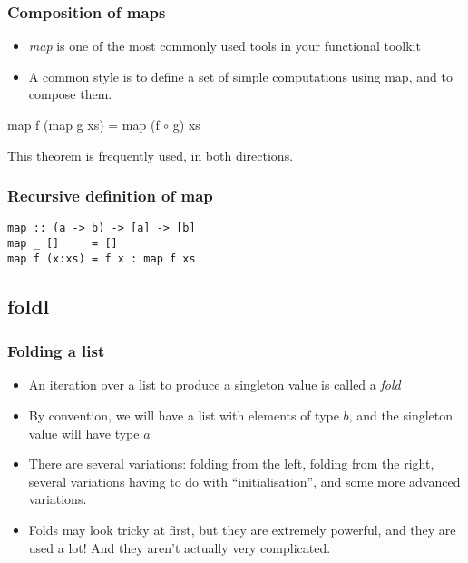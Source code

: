 \documentclass{beamer}
\begin{document}
\begin{frame}[fragile]
\frametitle{Composition of maps}

\begin{itemize}
\item \emph{map} is one of the most commonly used tools in your functional
  toolkit
\item A common style is to define a set of simple computations
  using map, and to compose them.
\end{itemize}

\begin{theorem}
map f (map g xs) = map (f $\circ$ g) xs
\end{theorem}

This theorem is frequently used, in both directions.

\end{frame}


\begin{frame}[fragile]
\frametitle{Recursive definition of map}

\begin{verbatim}
map :: (a -> b) -> [a] -> [b]
map _ []     = []
map f (x:xs) = f x : map f xs
\end{verbatim}

\end{frame}

\subsection{foldl}
\begin{frame}
\frametitle{Folding a list}

\begin{itemize}
\item An iteration over a list to produce a singleton value is
  called a \emph{fold}
\item By convention, we will have a list with elements of type $b$,
  and the singleton value will have type $a$
\item There are several variations: folding from the left, folding
  from the right, several variations having to do with
  ``initialisation'', and some more advanced variations.
\item Folds may look tricky at first, but they are extremely
  powerful, and they are used a lot!  And they aren't actually very
  complicated.
\end{itemize}

\end{frame}
\end{document}
